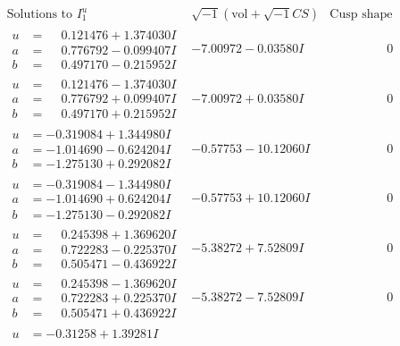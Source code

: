 \documentclass[1p]{elsarticle_modified}
\theoremstyle{definition}
\newcommand{\I}{\sqrt{-1}}
\begin{document}
$$\begin{array}{c|c|c}
\text{Solutions to }I^u_{1}& \I (\text{vol} + \sqrt{-1}CS) & \text{Cusp shape}\\
 \hline 
\begin{aligned}
u &= \phantom{-}0.121476 + 1.374030 I \\
a &= \phantom{-}0.776792 - 0.099407 I \\
b &= \phantom{-}0.497170 - 0.215952 I\end{aligned}
 & -7.00972 - 0.03580 I & \phantom{-0.000000 } 0 \\ \hline\begin{aligned}
u &= \phantom{-}0.121476 - 1.374030 I \\
a &= \phantom{-}0.776792 + 0.099407 I \\
b &= \phantom{-}0.497170 + 0.215952 I\end{aligned}
 & -7.00972 + 0.03580 I & \phantom{-0.000000 } 0 \\ \hline\begin{aligned}
u &= -0.319084 + 1.344980 I \\
a &= -1.014690 - 0.624204 I \\
b &= -1.275130 + 0.292082 I\end{aligned}
 & -0.57753 - 10.12060 I & \phantom{-0.000000 } 0 \\ \hline\begin{aligned}
u &= -0.319084 - 1.344980 I \\
a &= -1.014690 + 0.624204 I \\
b &= -1.275130 - 0.292082 I\end{aligned}
 & -0.57753 + 10.12060 I & \phantom{-0.000000 } 0 \\ \hline\begin{aligned}
u &= \phantom{-}0.245398 + 1.369620 I \\
a &= \phantom{-}0.722283 - 0.225370 I \\
b &= \phantom{-}0.505471 - 0.436922 I\end{aligned}
 & -5.38272 + 7.52809 I & \phantom{-0.000000 } 0 \\ \hline\begin{aligned}
u &= \phantom{-}0.245398 - 1.369620 I \\
a &= \phantom{-}0.722283 + 0.225370 I \\
b &= \phantom{-}0.505471 + 0.436922 I\end{aligned}
 & -5.38272 - 7.52809 I & \phantom{-0.000000 } 0 \\ \hline\begin{aligned}
u &= -0.31258 + 1.39281 I \\

\end{aligned}
\end{array}$$
\end{document}
